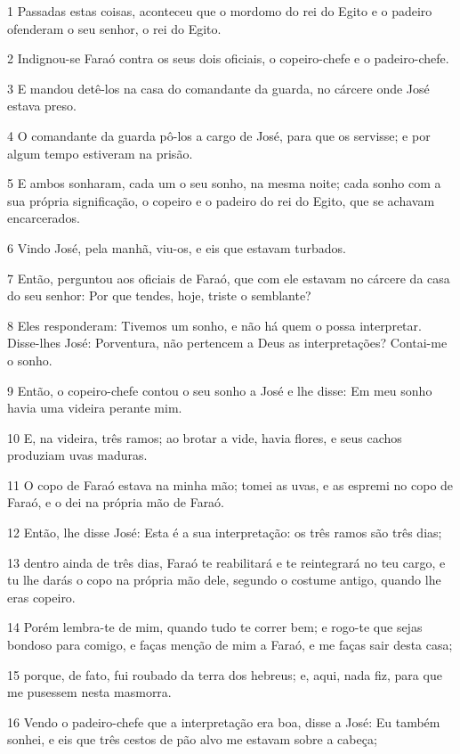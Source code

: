 \par 1 Passadas estas coisas, aconteceu que o mordomo do rei do Egito e o padeiro ofenderam o seu senhor, o rei do Egito.
\par 2 Indignou-se Faraó contra os seus dois oficiais, o copeiro-chefe e o padeiro-chefe.
\par 3 E mandou detê-los na casa do comandante da guarda, no cárcere onde José estava preso.
\par 4 O comandante da guarda pô-los a cargo de José, para que os servisse; e por algum tempo estiveram na prisão.
\par 5 E ambos sonharam, cada um o seu sonho, na mesma noite; cada sonho com a sua própria significação, o copeiro e o padeiro do rei do Egito, que se achavam encarcerados.
\par 6 Vindo José, pela manhã, viu-os, e eis que estavam turbados.
\par 7 Então, perguntou aos oficiais de Faraó, que com ele estavam no cárcere da casa do seu senhor: Por que tendes, hoje, triste o semblante?
\par 8 Eles responderam: Tivemos um sonho, e não há quem o possa interpretar. Disse-lhes José: Porventura, não pertencem a Deus as interpretações? Contai-me o sonho.
\par 9 Então, o copeiro-chefe contou o seu sonho a José e lhe disse: Em meu sonho havia uma videira perante mim.
\par 10 E, na videira, três ramos; ao brotar a vide, havia flores, e seus cachos produziam uvas maduras.
\par 11 O copo de Faraó estava na minha mão; tomei as uvas, e as espremi no copo de Faraó, e o dei na própria mão de Faraó.
\par 12 Então, lhe disse José: Esta é a sua interpretação: os três ramos são três dias;
\par 13 dentro ainda de três dias, Faraó te reabilitará e te reintegrará no teu cargo, e tu lhe darás o copo na própria mão dele, segundo o costume antigo, quando lhe eras copeiro.
\par 14 Porém lembra-te de mim, quando tudo te correr bem; e rogo-te que sejas bondoso para comigo, e faças menção de mim a Faraó, e me faças sair desta casa;
\par 15 porque, de fato, fui roubado da terra dos hebreus; e, aqui, nada fiz, para que me pusessem nesta masmorra.
\par 16 Vendo o padeiro-chefe que a interpretação era boa, disse a José: Eu também sonhei, e eis que três cestos de pão alvo me estavam sobre a cabeça;
